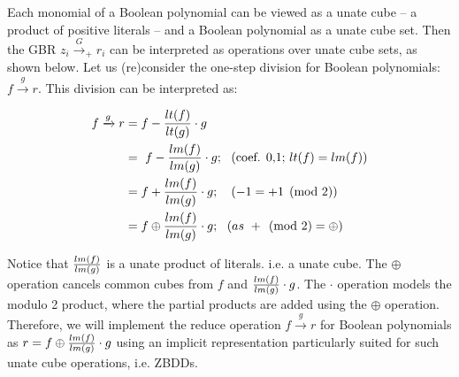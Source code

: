 Each monomial of a Boolean polynomial can be viewed as a unate cube --
a product of positive literals -- and a Boolean polynomial as a unate
cube set. Then the GBR $z_i\xrightarrow{G}_+ r_i$ can be interpreted
as %
operations over unate cube sets, 
as shown below. Let us (re)consider the one-step
division for Boolean polynomials: $f\xrightarrow{g} r$. This division
can be interpreted as:



 \begin{align}
\label{eqns:reduce}
f \xrightarrow{g} r & = f - {{lt(f)} \over {lt(g)}} \cdot g \\
& = ~ f - {{lm(f)} \over {lm(g)}} \cdot g; ~~(\text{coef. 0,1;} ~lt(f)=lm(f))\\ 
& = f + {{lm(f)} \over {lm(g)}} \cdot g; ~~~(-1 = +1 \pmod{ 2})\\
& = f \oplus {{lm(f)} \over {lm(g)}} \cdot g; ~~( as ~+ \pmod{2} =
\oplus) \label{eqns:reduce1}
\end{align}






Notice that ${{lm(f)} \over {lm(g)}}$ is a unate product of 
literals. i.e. a unate cube. The $\oplus$ operation cancels common
cubes from $f$ and ${{lm(f)} \over {lm(g)}}\cdot g$. The $\cdot$
operation models the modulo 2 product, where the partial products are
added using the $\oplus$  operation. Therefore, we
will implement the reduce operation $f\xrightarrow{g} r$ for Boolean
polynomials as $r = f \oplus {{lm(f)} \over {lm(g)}} \cdot g$ using
an implicit representation particularly suited for such unate cube
operations, i.e. ZBDDs.  

